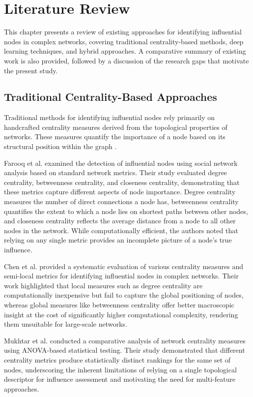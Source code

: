\chapter{Literature Review}

This chapter presents a review of existing approaches for identifying influential nodes in complex networks, covering traditional centrality-based methods, deep learning techniques, and hybrid approaches. A comparative summary of existing work is also provided, followed by a discussion of the research gaps that motivate the present study.

\section{Traditional Centrality-Based Approaches}

Traditional methods for identifying influential nodes rely primarily on handcrafted centrality measures derived from the topological properties of networks. These measures quantify the importance of a node based on its structural position within the graph \cite{farooq2018, chen2012}.

Farooq et al. \cite{farooq2018} examined the detection of influential nodes using social network analysis based on standard network metrics. Their study evaluated degree centrality, betweenness centrality, and closeness centrality, demonstrating that these metrics capture different aspects of node importance. Degree centrality measures the number of direct connections a node has, betweenness centrality quantifies the extent to which a node lies on shortest paths between other nodes, and closeness centrality reflects the average distance from a node to all other nodes in the network. While computationally efficient, the authors noted that relying on any single metric provides an incomplete picture of a node's true influence.

Chen et al. \cite{chen2012} provided a systematic evaluation of various centrality measures and semi-local metrics for identifying influential nodes in complex networks. Their work highlighted that local measures such as degree centrality are computationally inexpensive but fail to capture the global positioning of nodes, whereas global measures like betweenness centrality offer better macroscopic insight at the cost of significantly higher computational complexity, rendering them unsuitable for large-scale networks.

Mukhtar et al. \cite{mukhtar} conducted a comparative analysis of network centrality measures using ANOVA-based statistical testing. Their study demonstrated that different centrality metrics produce statistically distinct rankings for the same set of nodes, underscoring the inherent limitations of relying on a single topological descriptor for influence assessment and motivating the need for multi-feature approaches.


